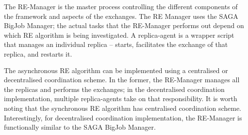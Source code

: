 \documentclass{rspublic}
\newcommand{\jhanote}[1]{ {\textcolor{red} { ***shantenu: #1 }}}
\newcommand{\alnote}[1]{ {\textcolor{blue} { ***andre: #1 }}}
\newcommand{\athotanote}[1]{ {\textcolor{green} { ***athota: #1 }}}
\newcommand{\alnote}[1]{}
\newcommand{\athotanote}[1]{}
\newcommand{\jhanote}[1]{}
\begin{document}
  
The RE-Manager is the master process controlling the different
components of the framework and aspects of the exchanges.  The RE
Manager %
uses the SAGA BigJob Manager; the actual tasks that the RE-Manager
performs out depend on which RE algorithm is being investigated.  A
replica-agent is a wrapper script that manages an individual
replica  -- starts, facilitates the exchange of that replica,
and restarts it.


The asynchronous RE algorithm can be implemented using a centralised
or decentralised coordination scheme.  In the former, the RE-Manager
manages all the replicas and performs the exchanges; in the
decentralised coordination implementation, multiple replica-agents
take on that responsibility.  It is worth noting that the synchronous
RE algorithm has centralised coordination scheme.  Interestingly, for
decentralised coordination implementation, the RE-Manager is
functionally similar to the SAGA BigJob Manager.


\end{document}
